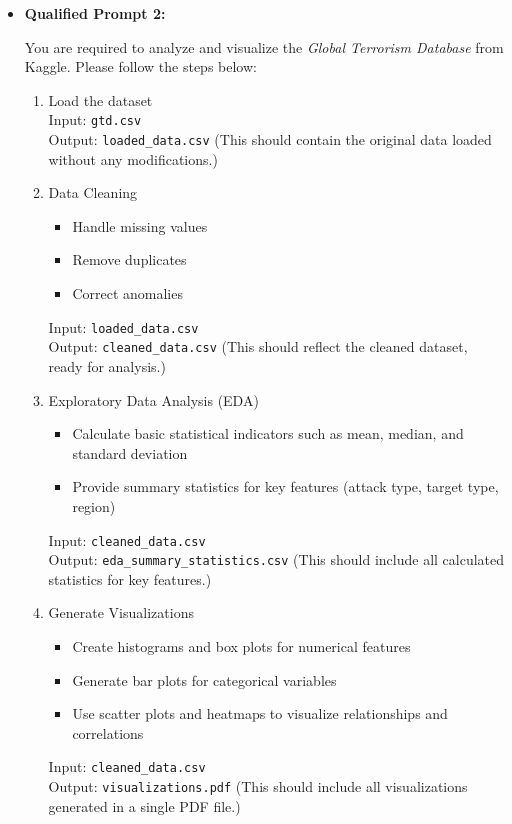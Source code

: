 \begin{itemize}
    \item \textbf{Qualified Prompt 2:}


\begin{tcolorbox}[colback=blue!5!white, colframe=blue!75!black, title=Qualified Prompt 2:, text width=\textwidth]
You are required to analyze and visualize the \textit{Global Terrorism Database} from Kaggle. Please follow the steps below:
\begin{enumerate}
    \item Load the dataset \\
    Input: \texttt{gtd.csv} \\
    Output: \texttt{loaded\_data.csv} (This should contain the original data loaded without any modifications.)
    
    \item Data Cleaning 
    \begin{itemize}
        \item Handle missing values
        \item Remove duplicates
        \item Correct anomalies
    \end{itemize}
    Input: \texttt{loaded\_data.csv} \\
    Output: \texttt{cleaned\_data.csv} (This should reflect the cleaned dataset, ready for analysis.)
    
    \item Exploratory Data Analysis (EDA) 
    \begin{itemize}
        \item Calculate basic statistical indicators such as mean, median, and standard deviation
        \item Provide summary statistics for key features (attack type, target type, region)
    \end{itemize}
    Input: \texttt{cleaned\_data.csv} \\
    Output: \texttt{eda\_summary\_statistics.csv} (This should include all calculated statistics for key features.)
    
    \item Generate Visualizations 
    \begin{itemize}
        \item Create histograms and box plots for numerical features
        \item Generate bar plots for categorical variables
        \item Use scatter plots and heatmaps to visualize relationships and correlations
    \end{itemize}
    Input: \texttt{cleaned\_data.csv} \\
    Output: \texttt{visualizations.pdf} (This should include all visualizations generated in a single PDF file.)
    

\end{enumerate}
\end{tcolorbox}
\end{itemize}
